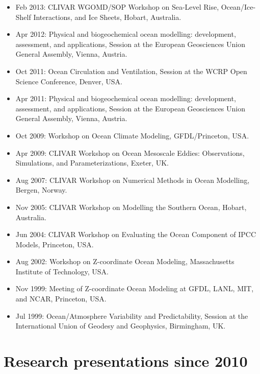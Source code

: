 \begin{itemize}[leftmargin=*]
\item Feb 2013: {\sc CLIVAR WGOMD/SOP Workshop on Sea-Level Rise, Ocean/Ice-Shelf Interactions, and Ice Sheets}, Hobart, Australia.  

\item Apr 2012: {\sc Physical and biogeochemical ocean modelling: development, assessment, and applications}, Session at the European Geosciences Union General Assembly, Vienna, Austria.

\item Oct 2011: {\sc Ocean Circulation and Ventilation}, Session at the WCRP Open Science Conference, Denver, USA. 

\item Apr 2011: {\sc Physical and biogeochemical ocean modelling: development, assessment, and applications}, Session at the European Geosciences Union General Assembly, Vienna, Austria.

\item Oct 2009: {\sc Workshop on Ocean Climate Modeling},
  GFDL/Princeton, USA.

 \item Apr 2009: {\sc CLIVAR Workshop on Ocean Mesoscale Eddies: Observations, Simulations, and Parameterizations}, Exeter, UK.

\item Aug 2007: {\sc CLIVAR Workshop on Numerical Methods in Ocean Modelling}, Bergen, Norway.

\item Nov 2005: {\sc CLIVAR Workshop on Modelling the Southern Ocean}, Hobart, Australia.

\item Jun 2004: {\sc CLIVAR Workshop on Evaluating the Ocean
  Component of IPCC Models}, Princeton, USA.

\item Aug 2002: {\sc Workshop on Z-coordinate Ocean Modeling}, Massachusetts Institute of Technology, USA.

\item Nov 1999: {\sc Meeting of Z-coordinate Ocean Modeling at GFDL, LANL, MIT, and NCAR}, Princeton, USA.

\item Jul 1999: {\sc Ocean/Atmosphere Variability and
  Predictability}, Session at the International Union of Geodesy and Geophysics, Birmingham, UK.

\end{itemize}


\section*{\sc \color{Maroon} Research presentations since 2010}
\vspace{-.3cm}

